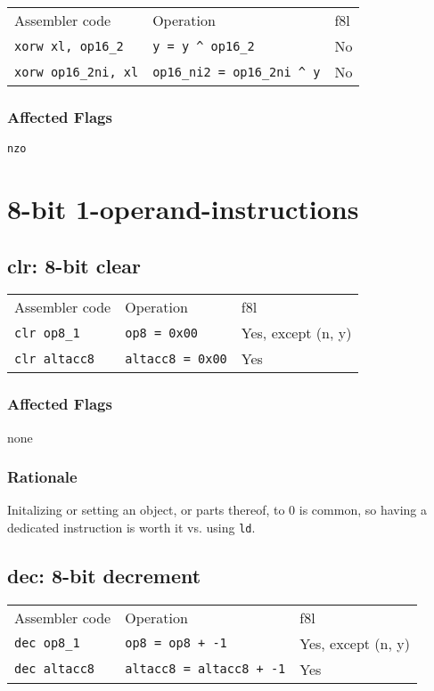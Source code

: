 \documentclass{book}
\begin{document}
\begin{tabular}{l l l}
Assembler code              & Operation                             & f8l \\
\texttt{xorw xl, op16\_2}   & \texttt{y = y \^{} op16\_2}           & No \\
\texttt{xorw op16\_2ni, xl} & \texttt{op16\_ni2 = op16\_2ni \^{} y} & No
\end{tabular}

\subsubsection*{Affected Flags}

\texttt{nzo}


\section{8-bit 1-operand-instructions}

\subsection{clr: 8-bit clear}

\begin{tabular}{l l l}
Assembler code       & Operation               & f8l \\
\texttt{clr op8\_1}  & \texttt{op8 = 0x00}     & Yes, except (n, y) \\
\texttt{clr altacc8} & \texttt{altacc8 = 0x00} & Yes
\end{tabular}

\subsubsection*{Affected Flags}

none

\subsubsection*{Rationale}

Initalizing or setting an object, or parts thereof, to 0 is common, so having a dedicated instruction is worth it vs. using \texttt{ld}.


\subsection{dec: 8-bit decrement}

\begin{tabular}{l l l}
Assembler code       & Operation                       & f8l \\
\texttt{dec op8\_1}  & \texttt{op8 = op8 + -1}         & Yes, except (n, y) \\
\texttt{dec altacc8} & \texttt{altacc8 = altacc8 + -1} & Yes
\end{tabular}
\end{document}
